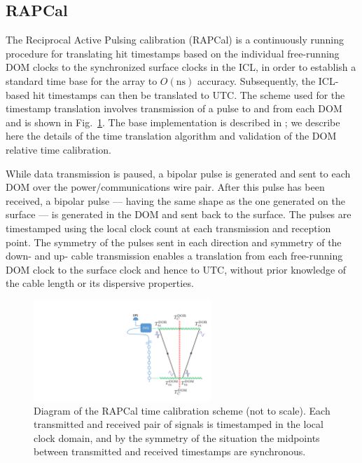\subsection{\label{sect:dom:rapcal}RAPCal}

The Reciprocal Active Pulsing calibration (RAPCal) is a
continuously running procedure for translating hit timestamps based on the 
individual free-running DOM clocks to the synchronized surface clocks in the
ICL, in order to establish a standard time base for the array to
$O(\mathrm{ns})$ accuracy.  Subsequently, the ICL-based hit timestamps can
then be translated to UTC.  The scheme used for the timestamp translation involves
transmission of a pulse to and from each DOM and is shown in
Fig.~\ref{fig:rapcal_symmetry}.  The base implementation is described in
\cite{ICECUBE:DAQ}; we describe here the details of the time translation
algorithm and validation of the DOM relative time calibration. 

While data transmission is paused, a bipolar pulse is generated and sent to
each DOM over the power/communications wire pair.  After 
this pulse has been received, a bipolar pulse --- having the same shape
as the one generated on the surface --- is generated in the DOM and sent
back to the surface.  The pulses are timestamped using the local
clock count at each transmission and reception point.  The symmetry of the
pulses sent in each direction and symmetry of the down- and up- cable
transmission enables a translation from each free-running DOM clock to the
surface clock and hence to UTC, without prior knowledge of the cable length
or its dispersive properties.

\begin{figure}[!h]
 \centering
 \includegraphics[width=0.6\textwidth]{graphics/dom/rapcal/rapcal_symmetry.pdf}
 \caption{Diagram of the RAPCal time calibration scheme (not to scale).
   Each transmitted and received pair of signals is
   timestamped in the local clock domain, and by the symmetry of the
   situation the midpoints between transmitted and received timestamps are
   synchronous.} 
 \label{fig:rapcal_symmetry}
\end{figure}

